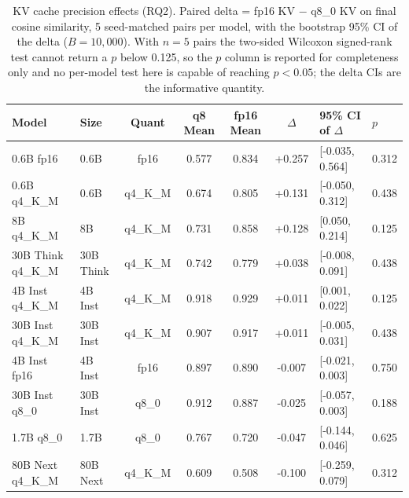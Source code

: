 \begin{table}[t]
\centering
\caption{KV cache precision effects (RQ2). Paired delta = fp16 KV $-$ q8\_0 KV
  on final cosine similarity, 5 seed-matched pairs per model, with the
  bootstrap 95\% CI of the delta ($B=10{,}000$). With $n=5$ pairs the
  two-sided Wilcoxon signed-rank test cannot return a $p$ below 0.125,
  so the $p$ column is reported for completeness only and no per-model
  test here is capable of reaching $p<0.05$; the delta CIs are the
  informative quantity.}
\label{tab:rq2}
\small
\begin{tabular}{llccccll}
\toprule
Model & Size & Quant & q8 Mean & fp16 Mean & $\Delta$ & 95\% CI of $\Delta$ & $p$ \\
\midrule
0.6B fp16 & 0.6B & fp16 & 0.577 & 0.834 & +0.257 & [-0.035, 0.564] & 0.312 \\
0.6B q4\_K\_M & 0.6B & q4\_K\_M & 0.674 & 0.805 & +0.131 & [-0.050, 0.312] & 0.438 \\
8B q4\_K\_M & 8B & q4\_K\_M & 0.731 & 0.858 & +0.128 & [0.050, 0.214] & 0.125 \\
30B Think q4\_K\_M & 30B Think & q4\_K\_M & 0.742 & 0.779 & +0.038 & [-0.008, 0.091] & 0.438 \\
4B Inst q4\_K\_M & 4B Inst & q4\_K\_M & 0.918 & 0.929 & +0.011 & [0.001, 0.022] & 0.125 \\
30B Inst q4\_K\_M & 30B Inst & q4\_K\_M & 0.907 & 0.917 & +0.011 & [-0.005, 0.031] & 0.438 \\
4B Inst fp16 & 4B Inst & fp16 & 0.897 & 0.890 & -0.007 & [-0.021, 0.003] & 0.750 \\
30B Inst q8\_0 & 30B Inst & q8\_0 & 0.912 & 0.887 & -0.025 & [-0.057, 0.003] & 0.188 \\
1.7B q8\_0 & 1.7B & q8\_0 & 0.767 & 0.720 & -0.047 & [-0.144, 0.046] & 0.625 \\
80B Next q4\_K\_M & 80B Next & q4\_K\_M & 0.609 & 0.508 & -0.100 & [-0.259, 0.079] & 0.312 \\
\bottomrule
\end{tabular}
\end{table}
